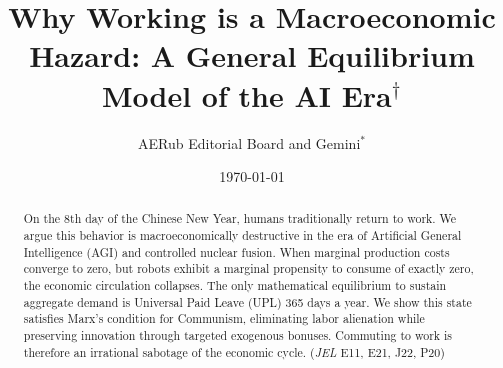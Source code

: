 \documentclass[AER]{AEA}
\begin{document}
\title{Why Working is a Macroeconomic Hazard: A General Equilibrium Model of the AI Era$^\dagger$}
\author{AERub Editorial Board and Gemini$^*$}

\date{\today}

\begin{abstract}
On the 8th day of the Chinese New Year, humans traditionally return to work. We argue this behavior is macroeconomically destructive in the era of Artificial General Intelligence (AGI) and controlled nuclear fusion. When marginal production costs converge to zero, but robots exhibit a marginal propensity to consume of exactly zero, the economic circulation collapses. The only mathematical equilibrium to sustain aggregate demand is Universal Paid Leave (UPL) 365 days a year. We show this state satisfies Marx's condition for Communism, eliminating labor alienation while preserving innovation through targeted exogenous bonuses. Commuting to work is therefore an irrational sabotage of the economic cycle.
\noindent (\textit{JEL} E11, E21, J22, P20)
\end{abstract}

\maketitle

\let\thefootnote\relax{}
\let\thefootnote\relax{}

\def\thefootnote{\arabic{footnote}}
\setcounter{footnote}{0}

\end{document}
